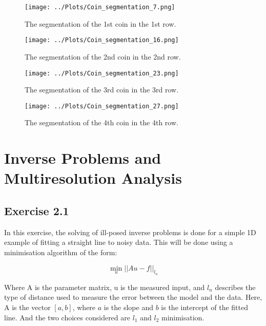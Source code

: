 \documentclass[12pt]{report} %
\begin{document}
\begin{figure}[htbp]
    \centering
    \texttt{[image: ../Plots/Coin\_segmentation\_7.png]}
    \caption{The segmentation of the 1st coin in the 1st row.}
    \label{fig:coin_7_segmentation}
\end{figure}

\begin{figure}[htbp]
    \centering
    \texttt{[image: ../Plots/Coin\_segmentation\_16.png]}
    \caption{The segmentation of the 2nd coin in the 2nd row.}
    \label{fig:coin_16_segmentation}
\end{figure}

\begin{figure}[htbp]
    \centering
    \texttt{[image: ../Plots/Coin\_segmentation\_23.png]}
    \caption{The segmentation of the 3rd coin in the 3rd row.}
    \label{fig:coin_23_segmentation}
\end{figure}

\begin{figure}[htbp]
    \centering
    \texttt{[image: ../Plots/Coin\_segmentation\_27.png]}
    \caption{The segmentation of the 4th coin in the 4th row.}
    \label{fig:coin_27_segmentation}
\end{figure}


\chapter{Inverse Problems and Multiresolution Analysis}

\section{Exercise 2.1}

In this exercise, the solving of ill-posed inverse problems is done for a simple 1D example of fitting a straight line to noisy data. This will be done using a minimisation algorithm of the form:

\begin{equation}
    \min_{u} ||Au - f||_{l_{n}}
\end{equation}

Where A is the parameter matrix, u is the measured input, and $l_{n}$ describes the type of distance used to measure the error between the model and the data. Here, A is the vector $[a, b]$, where $a$ is the slope and $b$ is the intercept of the fitted line. And the two choices considered are $l_{1}$ and $l_{2}$ minimisation.
\end{document}

